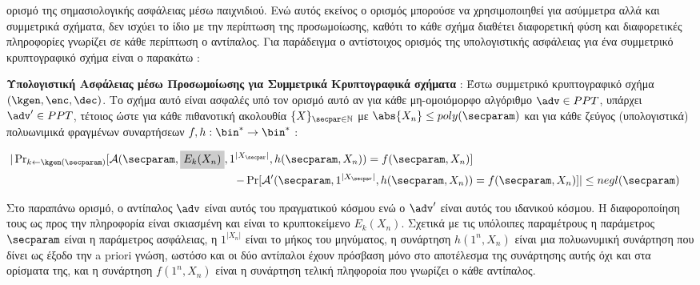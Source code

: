 ορισμό της σημασιολογικής ασφάλειας μέσω παιχνιδιού. Ενώ αυτός εκείνος ο ορισμός μπορούσε να χρησιμοποιηθεί για ασύμμετρα αλλά και συμμετρικά σχήματα, δεν ισχύει το ίδιο με την περίπτωση της προσωμοίωσης, καθότι το κάθε σχήμα διαθέτει διαφορετική φύση και διαφορετικές πληροφορίες γνωρίζει σε κάθε περίπτωση ο αντίπαλος. Για παράδειγμα ο αντίστοιχος ορισμός της υπολογιστικής ασφάλειας για ένα συμμετρικό κρυπτογραφικό σχήμα είναι ο παρακάτω :

\begin{definition}
    \label{def:simulation_security_symmetric_scheme}
    \textbf{Υπολογιστική Ασφάλειας μέσω Προσωμοίωσης για Συμμετρικά Κρυπτογραφικά σχήματα} :  Έστω συμμετρικό κρυπτογραφικό σχήμα $(\kgen, \enc, \dec)$. Το σχήμα αυτό είναι ασφαλές υπό τον ορισμό αυτό αν για κάθε μη-ομοιόμορφο αλγόριθμο $\adv \in PPT$, υπάρχει $\adv' \in PPT$, τέτοιος ώστε για κάθε πιθανοτική ακολουθία $\{X\}_{\secpar \in \mathbb{N}}$  με $\abs{X_n} \le poly(\secparam)$ και για κάθε ζεύγος (υπολογιστικά) πολυωνιμικά φραγμένων συναρτήσεων $f, h : \bin^* \rightarrow \bin^*$ :

    $$
    \begin{aligned}
    |\operatorname{Pr}_{k \leftarrow \kgen(\secparam)}[\mathcal{A}(\secparam, \highlight{Light-gray}{E_{k}(X_{n})}, 1^{|X_{\secpar}|}, h(\secparam, X_{n})) = f(\secparam, X_{n})] \\
    - \operatorname{Pr}[\mathcal{A}'(\secparam, 1^{|X_{\secpar}|}, h(\secparam, X_{n})) &= f(\secparam, X_{n})]| \le negl(\secparam)
    \end{aligned}
    $$
\end{definition}

Στο παραπάνω ορισμό, ο αντίπαλος $\adv$ είναι αυτός του πραγματικού κόσμου ενώ ο $\adv'$ είναι αυτός του ιδανικού κόσμου. Η διαφοροποίηση τους ως προς την πληροφορία είναι σκιασμένη και είναι το κρυπτοκείμενο $E_k(X_n)$. Σχετικά με τις υπόλοιπες παραμέτρους η παράμετρος $\secparam$ είναι η παράμετρος ασφάλειας, η $1^{|X_n|}$ είναι το μήκος του μηνύματος, η συνάρτηση $h(1^n, X_n)$ είναι μια πολυωνυμική συνάρτηση που δίνει ως έξοδο την a priori γνώση, ωστόσο και οι δύο αντίπαλοι έχουν πρόσβαση μόνο στο αποτέλεσμα της συνάρτησης αυτής όχι και στα ορίσματα της, και η συνάρτηση $f(1^n, X_n)$ είναι η συνάρτηση τελική πληφοροία που γνωρίζει ο κάθε αντίπαλος.

